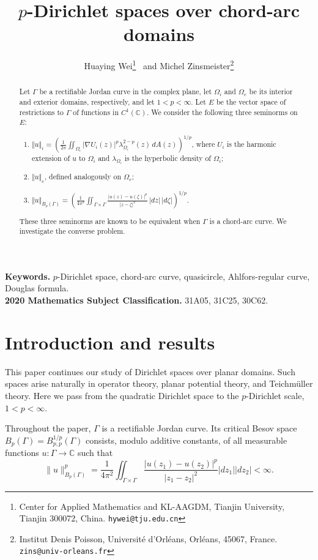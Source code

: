 \documentclass[11pt]{article}
\title{$p$-Dirichlet spaces over chord-arc domains}
\author{Huaying Wei\thanks{Center for Applied Mathematics and KL-AAGDM, Tianjin
University, Tianjin 300072, China.
\texttt{hywei@tju.edu.cn}}
\ and Michel Zinsmeister\thanks{Institut Denis Poisson, Universit\'e d'Orl\'eans, 
Orl\'eans, 45067, France.
\texttt{zins@univ-orleans.fr}}}
\date{}
\numberwithin{equation}{section}
\theoremstyle{remark}
\begin{document}
\maketitle
\insert{}


\begin{abstract}
Let $\Gamma$ be a rectifiable Jordan curve in the complex plane, let
$\Omega_i$ and $\Omega_e$ be its interior and exterior domains, respectively,
and let $1<p<\infty$.  Let $E$ be the vector space of restrictions to $\Gamma$
of functions in $C^1(\mathbb C)$.  We consider the following three seminorms on
$E$:
\begin{enumerate}
\item $\displaystyle \Vert u\Vert_i=\left(\frac{1}{2\pi}
\iint_{\Omega_i}|\nabla U_i(z)|^p\lambda_{\Omega_i}^{2-p}(z)\,dA(z)\right)^{1/p}$,
where $U_i$ is the harmonic extension of $u$ to $\Omega_i$ and
$\lambda_{\Omega_i}$ is the hyperbolic density of $\Omega_i$;
\item $\Vert u\Vert_e$, defined analogously on $\Omega_e$;
\item $\displaystyle \Vert u\Vert_{B_p(\Gamma)} =
\left(\frac{1}{4\pi^2}\iint_{\Gamma\times\Gamma}
\frac{|u(z)-u(\zeta)|^p}{|z-\zeta|^2}\,|dz|\,|d\zeta|\right)^{1/p}$.
\end{enumerate}
These three seminorms are known to be equivalent when $\Gamma$ is a
chord-arc curve.  We investigate the converse problem. 
\end{abstract}

\medskip
\noindent
\textbf{Keywords.}
$p$-Dirichlet space, chord-arc curve, quasicircle, Ahlfors-regular curve,
Douglas formula.\\
\medskip
\noindent
\textbf{2020 Mathematics Subject Classification.}
31A05, 31C25, 30C62.

\section{Introduction and results}
This paper continues our study \cite{WZ} of Dirichlet spaces over planar
domains.  Such spaces arise naturally in operator theory, planar potential
theory, and Teichm\"uller theory.  Here we pass from the quadratic Dirichlet
space to the $p$-Dirichlet scale, $1<p<\infty$.



Throughout the paper, $\Gamma$ is a rectifiable Jordan curve.  Its
critical Besov space $B_p(\Gamma)=B_{p,p}^{1/p}(\Gamma)$ consists, modulo
additive constants, of all measurable functions $u:\Gamma\to\mathbb C$ such
that
$$\|u\|_{B_{p}(\Gamma)}^p = \frac{1}{4\pi^2} \iint_{\Gamma\times \Gamma}  \frac{|u(z_1) - u(z_2)|^p}{|z_1 - z_2|^2} |dz_1||dz_2|<\infty.$$
 
\end{document}
